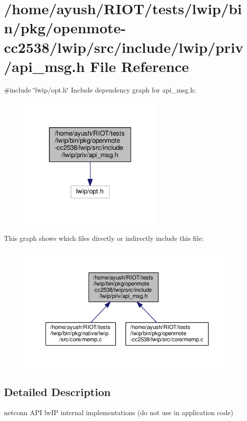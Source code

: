\hypertarget{openmote-cc2538_2lwip_2src_2include_2lwip_2priv_2api__msg_8h}{}\section{/home/ayush/\+R\+I\+O\+T/tests/lwip/bin/pkg/openmote-\/cc2538/lwip/src/include/lwip/priv/api\+\_\+msg.h File Reference}
\label{openmote-cc2538_2lwip_2src_2include_2lwip_2priv_2api__msg_8h}
{\ttfamily \#include \char`\"{}lwip/opt.\+h\char`\"{}}\newline
Include dependency graph for api\+\_\+msg.\+h\+:
\nopagebreak
\begin{figure}[H]
\begin{center}
\leavevmode
\includegraphics[width=205pt]{openmote-cc2538_2lwip_2src_2include_2lwip_2priv_2api__msg_8h__incl}
\end{center}
\end{figure}
This graph shows which files directly or indirectly include this file\+:
\nopagebreak
\begin{figure}[H]
\begin{center}
\leavevmode
\includegraphics[width=350pt]{openmote-cc2538_2lwip_2src_2include_2lwip_2priv_2api__msg_8h__dep__incl}
\end{center}
\end{figure}


\subsection{Detailed Description}
netconn A\+PI lw\+IP internal implementations (do not use in application code) 
